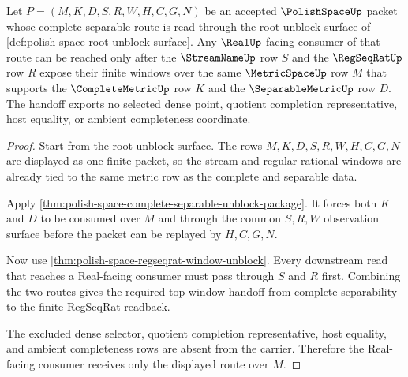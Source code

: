 \begin{theorem}
\label{thm:polishspace-complete-separable-regseqrat-real-handoff}
Let $P=(M,K,D,S,R,W,H,C,G,N)$ be an accepted $\PolishSpaceUp$ packet whose complete-separable route is read through the root unblock surface of \autoref{def:polish-space-root-unblock-surface}. Any $\RealUp$-facing consumer of that route can be reached only after the $\StreamNameUp$ row $S$ and the $\RegSeqRatUp$ row $R$ expose their finite windows over the same $\MetricSpaceUp$ row $M$ that supports the $\CompleteMetricUp$ row $K$ and the $\SeparableMetricUp$ row $D$. The handoff exports no selected dense point, quotient completion representative, host equality, or ambient completeness coordinate.
\end{theorem}
\begin{proof}
Start from the root unblock surface. The rows $M,K,D,S,R,W,H,C,G,N$ are displayed as one finite packet, so the stream and regular-rational windows are already tied to the same metric row as the complete and separable data.

Apply \autoref{thm:polish-space-complete-separable-unblock-package}. It forces both $K$ and $D$ to be consumed over $M$ and through the common $S,R,W$ observation surface before the packet can be replayed by $H,C,G,N$.

Now use \autoref{thm:polish-space-regseqrat-window-unblock}. Every downstream read that reaches a Real-facing consumer must pass through $S$ and $R$ first. Combining the two routes gives the required top-window handoff from complete separability to the finite RegSeqRat readback.

The excluded dense selector, quotient completion representative, host equality, and ambient completeness rows are absent from the carrier. Therefore the Real-facing consumer receives only the displayed route over $M$.
\end{proof}
